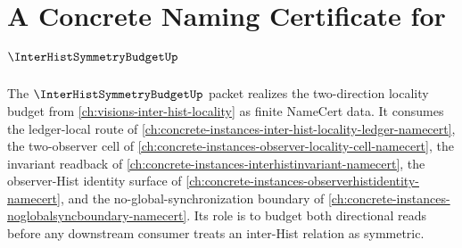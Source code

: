 \chapter{A Concrete Naming Certificate for $\InterHistSymmetryBudgetUp$}
\label{ch:concrete-instances-interhist-symmetry-budget-namecert}

The $\InterHistSymmetryBudgetUp$ packet realizes the two-direction locality budget from \autoref{ch:visions-inter-hist-locality} as finite NameCert data. It consumes the ledger-local route of \autoref{ch:concrete-instances-inter-hist-locality-ledger-namecert}, the two-observer cell of \autoref{ch:concrete-instances-observer-locality-cell-namecert}, the invariant readback of \autoref{ch:concrete-instances-interhistinvariant-namecert}, the observer-Hist identity surface of \autoref{ch:concrete-instances-observerhistidentity-namecert}, and the no-global-synchronization boundary of \autoref{ch:concrete-instances-noglobalsyncboundary-namecert}. Its role is to budget both directional reads before any downstream consumer treats an inter-Hist relation as symmetric.



